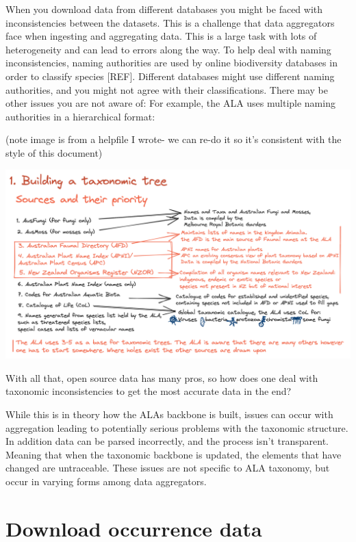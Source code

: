 \documentclass[
  letterpaper,
  DIV=11,
  numbers=noendperiod,
  oneside]{scrreprt}
\begin{document}
When you download data from different databases you might be faced with
inconsistencies between the datasets. This is a challenge that data
aggregators face when ingesting and aggregating data. This is a large
task with lots of heterogeneity and can lead to errors along the way. To
help deal with naming inconsistencies, naming authorities are used by
online biodiversity databases in order to classify species {[}REF{]}.
Different databases might use different naming authorities, and you
might not agree with their classifications. There may be other issues
you are not aware of: For example, the ALA uses multiple naming
authorities in a hierarchical format:

(note image is from a helpfile I wrote- we can re-do it so it's
consistent with the style of this document)

\includegraphics{./images/image-1066364510.png}

With all that, open source data has many pros, so how does one deal with
taxonomic inconsistencies to get the most accurate data in the end?

While this is in theory how the ALAs backbone is built, issues can occur
with aggregation leading to potentially serious problems with the
taxonomic structure. In addition data can be parsed incorrectly, and the
process isn't transparent. Meaning that when the taxonomic backbone is
updated, the elements that have changed are untraceable. These issues
are not specific to ALA taxonomy, but occur in varying forms among data
aggregators.


\hypertarget{sec-download-data}{%
\chapter{Download occurrence data}\label{sec-download-data}}
\end{document}
